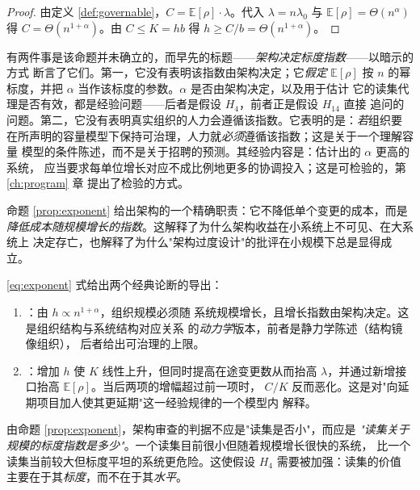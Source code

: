 \begin{proof}
由定义 \ref{def:governable}，$C = \mathbb{E}[\rho]\cdot\lambda$。代入
$\lambda = n\lambda_0$ 与 $\mathbb{E}[\rho] = \Theta(n^{\alpha})$ 得
$C = \Theta(n^{1+\alpha})$。由 $C \le K = hb$ 得
$h \ge C/b = \Theta(n^{1+\alpha})$。
\end{proof}

有两件事是该命题并未确立的，而早先的标题——\emph{架构决定标度指数}——以暗示的方式
断言了它们。第一，它没有表明该指数由架构决定；它\emph{假定} $\mathbb{E}[\rho]$ 按
$n$ 的幂标度，并把 $\alpha$ 当作该标度的参数。$\alpha$ 是否由架构决定，以及用于估计
它的读集代理是否有效，都是经验问题——后者是假设 $H_4$，前者正是假设 $H_{14}$ 直接
追问的问题。第二，它没有表明真实组织的人力会遵循该指数。它表明的是：\emph{若}组织要
在所声明的容量模型下保持可治理，人力就\emph{必须}遵循该指数；这是关于一个理解容量
模型的条件陈述，而不是关于招聘的预测。其经验内容是：估计出的 $\alpha$ 更高的系统，
应当要求每单位增长对应不成比例地更多的协调投入；这是可检验的，第 \ref{ch:program} 章
提出了检验的方式。

\begin{corollary}[架构的实际作用]\label{cor:arch-role}
命题 \ref{prop:exponent} 给出架构的一个精确职责：它不降低单个变更的成本，而是
\emph{降低成本随规模增长的指数}。这解释了为什么架构收益在小系统上不可见、在大系统上
决定存亡，也解释了为什么"架构过度设计"的批评在小规模下总是显得成立。
\end{corollary}

\begin{corollary}[两个经典结论的导出]\label{cor:brooks}
\eqref{eq:exponent} 式给出两个经典论断的导出：
\begin{enumerate}[label=(\alph*)]
\item {}：由 $h \propto n^{1+\alpha}$，组织规模必须随
      系统规模增长，且增长指数由架构决定。这是组织结构与系统结构对应关系
      \cite{conway1968} 的\emph{动力学}版本，前者是静力学陈述（结构镜像组织），
      后者给出可治理的上限。
\item {}：增加 $h$ 使 $K$ 线性上升，但同时提高在途变更数从而抬高
      $\lambda$，并通过新增接口抬高 $\mathbb{E}[\rho]$。当后两项的增幅超过前一项时，
      $C/K$ 反而恶化。这是对"向延期项目加人使其更延期"这一经验规律的一个模型内
      解释。
\end{enumerate}
\end{corollary}

\begin{principle}[设计含义]\label{pr:governable-design}
由命题 \ref{prop:exponent}，架构审查的判据不应是"读集是否小"，而应是
\emph{"读集关于规模的标度指数是多少"}。一个读集目前很小但随着规模增长很快的系统，
比一个读集当前较大但标度平坦的系统更危险。这使假设 $H_4$ 需要被加强：读集的价值
主要在于其\emph{标度}，而不在于其\emph{水平}。
\end{principle}

